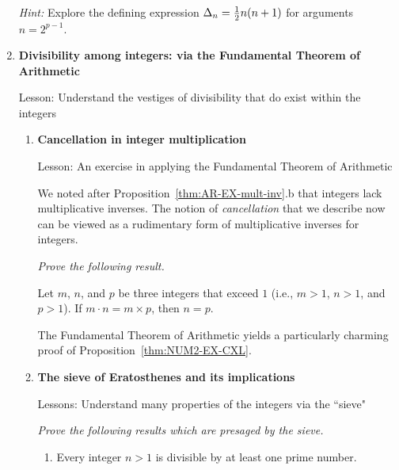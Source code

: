 \begin{enumerate}
\medskip

{\em Hint:} Explore the defining expression $\Delta_{n} = {1 \over 2} n(n+1)$ for arguments $n = 2^{p-1}$. 


\medskip\item
{\bf Divisibility among integers: via the Fundamental Theorem of Arithmetic}

{\sc Lesson:} Understand the vestiges of divisibility that do exist within the integers

  \begin{enumerate}
  \item
{\bf Cancellation in integer multiplication}

{\sc Lesson:} An exercise in applying the Fundamental Theorem of Arithmetic

\smallskip


We noted after Proposition~\ref{thm:AR-EX-mult-inv}.b that integers lack multiplicative inverses.  The notion of {\it cancellation} that we describe now can be viewed as a rudimentary form of multiplicative inverses for integers.

\smallskip

{\em Prove the following result.}

\begin{prop}
\label{thm:NUM2-EX-CXL}
Let $m$, $n$, and $p$ be three integers that exceed $1$ (i.e., $m>1$, $n>1$, and $p >1$).  If $m \cdot n = m \times p$, then $n = p$.
\end{prop}

The Fundamental Theorem of Arithmetic yields a particularly charming proof of Proposition~\ref{thm:NUM2-EX-CXL}.
\medskip

  \medskip\item
{\bf The sieve of Eratosthenes and its implications}

{\sc Lessons:} Understand many properties of the integers via the ``sieve"


\smallskip

{\em Prove the following results which are presaged by the sieve.}
\smallskip
     \begin{enumerate}
     \item
\begin{prop}
Every integer $n>1$ is divisible by at least one prime number.
\end{prop}


\end{enumerate}
\end{enumerate}
\end{enumerate}

